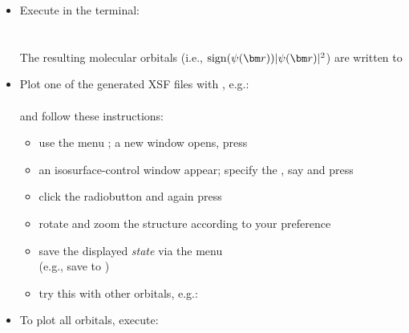 \documentclass[landscape]{foils}
\begin{document}

\vspace{-0.5em}
\begin{itemize}
\item Execute in the terminal:\\[0.5em]
  \\
  \\[0.5em]
  {\small The resulting molecular orbitals (i.e., $\sign(\psi(\vr))|\psi(\vr)|^2$) are
  written to }

  \vspace{-0.5em}
\item Plot one of the generated XSF files with ,
  e.g.:\\[0.5em]
  \\[0.5em]
  and follow these instructions:
  \vspace{-0.5em}
  {\small
    \begin{itemize}
    \item use the menu ; a new window opens, press \file{[OK]}
    \item an isosurface-control window appear; specify the ,
      say  and press \file{[Submit]}
    \item click the  radiobutton and again
      press \file{[Submit]}
    \item rotate and zoom the structure according to your preference
    \item save the displayed {\em state} via the menu
      \\
      (e.g., save to )
    \item try this with other orbitals, e.g.:\\[0.3em]
      {\small {}}
    \end{itemize}
  }
  \vspace{-0.5em}
\item To plot all orbitals, execute: ~
\end{itemize}
\end{document}
